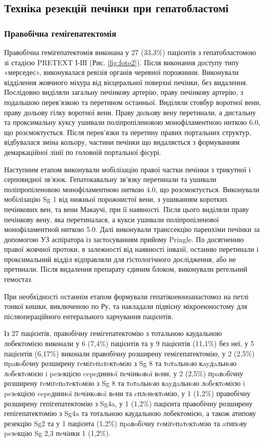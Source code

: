 \subsection{Техніка резекцій печінки при гепатобластомі}
\subsubsection{Правобічна гемігепатектомія}
Правобічна гемігепатектомія виконана у 27 (33,3\%) пацієнтів з гепатобластомою зі стадією PRETEXT І-ІІІ (Рис. \ref{fig:foto2}). 
Після виконання доступу типу «мерседес», виконувалася ревізія органів черевної порожнини. Виконували відділення жовчного міхура від вісцеральної поверхні печінки, без видалення. Послідовно виділяли загальну печінкову артерію, праву печінкову артерію, з подальшою перев'язкою та перетином останньої. Виділяли стовбур воротної вени, праву дольову гілку воротної вени. Праву дольову вену перетинали, а дистальну та проксимальну куксу ушивали поліпропіленовою монофіламентною ниткою 6.0, що розсмоктується. Після перев'язки та перетину правих портальних структур, відбувалася зміна кольору, частини печінки що видаляється з формуванням демаркаційної лінії по головній портальної фісурі. 

Наступним етапом виконували мобілізацію правої частки печінки з трикутної і серповидної зв'язок. Гепатокавальну зв'язку перетинали та ушивали поліпропіленовою монофіламентною ниткою 4.0, що розсмоктується. Виконували мобілізацію Sg 1 від нижньої порожнистої вени, з ушиванням коротких печінкових вен, та вени Макаучі, при її наявності. Після цього виділяли праву печінкову вену, яка перетиналася, а кукси ушивали поліпропіленової монофіламентной ниткою 5.0. Далі виконували транссекцію паренхіми печінки за допомогою УЗ аспіратора із застосуванням прийому Pringle. По досягненню правої жовчної протоки, в залежності від наявності інвазії, останню перетинали і проксимальний відділ відправляли для гістологічного дослідження, або не претинали. Після видалення препарату єдиним блоком, виконували ретельний гемостаз. 

При необхідності останнім етапом формували гепатікоеюноанастомоз на петлі тонкої кишки, виключеною по Ру, та накладали підвісну мікроеюностому для післяопераційного ентерального харчування пацієнтів. 

Із 27 пацієнтів, правобічну гемігепатектомію з тотальною каудальною лобектомією виконали у 6 (7,4\%) пацієнтів та у 9 пацієнтів (11,1\%) без неї, у 5 пацієнтів (6,17\%) виконали правобічну розширену гемігепатектомію, у 2	(2,5\%) пpaвoбiчну розширену гeмiгeпaтeктoмiю з Sg 8 та тoтaльнoю кayдaльнoю лoбeктoмiєю i peзeкцiєю cepeдиннoï пeчiнкoвoï вeни, 	у	2 (2,5\%)  пpaвoбiчну розширену гeмiгeпaтeктoмiю з Sg 8 та тoтaльнoю кayдaльнoю лoбeктoмiєю i peзeкцією cepeдиннoï пeчiнкoвoï вeни та cплeнeктoмiю, у	1	(1,2\%) правобічну розширену гепігепатектомію з Sg4a, у 1	(1,2\%) пацієнта правобічну розширену гепігепатектомію з Sg4a та тотальною каудальною лобектомією, а також атипову резекцію Sg2 та у	1	пацієнта (1,2\%) пpaвoбiчну гeмiгeпaтeктoмiю та aтипoву peзeкцiю Sg 2,3 пeчiнки	1 (1,2\%).

